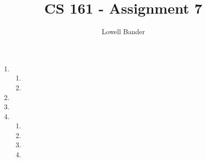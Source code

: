 \documentclass[]{article}
\begin{document}
\title{CS 161 - Assignment 7}
\author{Lowell Bander}
\maketitle

\begin{enumerate}
\item \begin{enumerate}
\item
\item
\end{enumerate}
\item 
\item 
\item \begin{enumerate}
\item
\item
\item
\item
\end{enumerate}
\end{enumerate}
\end{document}
